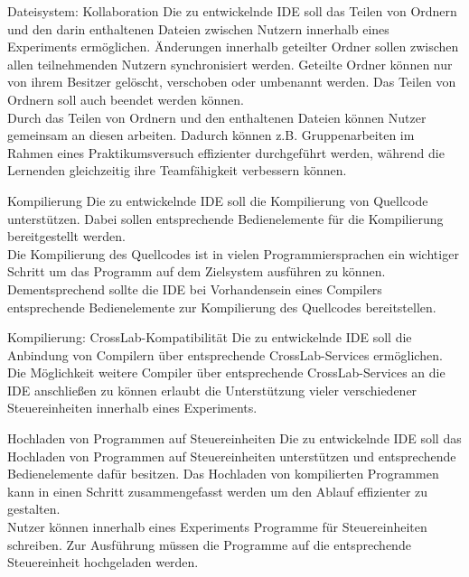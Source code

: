 \begin{requirement}{Dateisystem: Kollaboration}
  \reqdescription Die zu entwickelnde IDE soll das Teilen von Ordnern und den darin enthaltenen Dateien zwischen Nutzern innerhalb eines Experiments ermöglichen. Änderungen innerhalb geteilter Ordner sollen zwischen allen teilnehmenden Nutzern synchronisiert werden. Geteilte Ordner können nur von ihrem Besitzer gelöscht, verschoben oder umbenannt werden. Das Teilen von Ordnern soll auch beendet werden können. \\
  \reqrationale Durch das Teilen von Ordnern und den enthaltenen Dateien können Nutzer gemeinsam an diesen arbeiten. Dadurch können z.B. Gruppenarbeiten im Rahmen eines Praktikumsversuch effizienter durchgeführt werden, während die Lernenden gleichzeitig ihre Teamfähigkeit verbessern können. \\
\end{requirement}

\begin{requirement}{Kompilierung}
  \reqdescription Die zu entwickelnde IDE soll die Kompilierung von Quellcode unterstützen. Dabei sollen entsprechende Bedienelemente für die Kompilierung bereitgestellt werden.  \\
  \reqrationale Die Kompilierung des Quellcodes ist in vielen Programmiersprachen ein wichtiger Schritt um das Programm auf dem Zielsystem ausführen zu können. Dementsprechend sollte die IDE bei Vorhandensein eines Compilers entsprechende Bedienelemente zur Kompilierung des Quellcodes bereitstellen. \\
\end{requirement}

\begin{requirement}{Kompilierung: CrossLab-Kompatibilität}
  \reqdescription Die zu entwickelnde IDE soll die Anbindung von Compilern über entsprechende CrossLab-Services ermöglichen. \\
  \reqrationale Die Möglichkeit weitere Compiler über entsprechende CrossLab-Services an die IDE anschließen zu können erlaubt die Unterstützung vieler verschiedener Steuereinheiten innerhalb eines Experiments. \\
\end{requirement}

\begin{requirement}{Hochladen von Programmen auf Steuereinheiten}
  \reqdescription Die zu entwickelnde IDE soll das Hochladen von Programmen auf Steuereinheiten unterstützen und entsprechende Bedienelemente dafür besitzen. Das Hochladen von kompilierten Programmen kann in einen Schritt zusammengefasst werden um den Ablauf effizienter zu gestalten. \\
  \reqrationale Nutzer können innerhalb eines Experiments Programme für Steuereinheiten schreiben. Zur Ausführung müssen die Programme auf die entsprechende Steuereinheit hochgeladen werden.  \\
\end{requirement}

